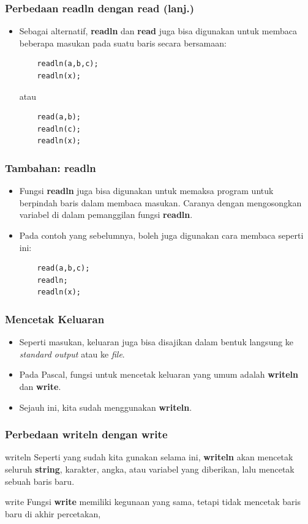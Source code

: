 \documentclass{beamer}
\begin{document}
\begin{frame}[fragile]
\frametitle{Perbedaan readln dengan read (lanj.)}
\begin{itemize}
    \item Sebagai alternatif, \textbf{readln} dan \textbf{read} juga bisa digunakan untuk membaca beberapa masukan pada suatu baris secara bersamaan:
    \begin{lstlisting}
    readln(a,b,c);
    readln(x);
    \end{lstlisting}
    atau
    \begin{lstlisting}
    read(a,b);
    readln(c);
    readln(x);
    \end{lstlisting}
\end{itemize}
\end{frame}

\begin{frame}[fragile]
\frametitle{Tambahan: readln}
\begin{itemize}
    \item Fungsi \textbf{readln} juga bisa digunakan untuk memaksa program untuk berpindah baris dalam membaca masukan. Caranya dengan mengosongkan variabel di dalam pemanggilan fungsi \textbf{readln}.
    \item Pada contoh yang sebelumnya, boleh juga digunakan cara membaca seperti ini:
    \begin{lstlisting}
    read(a,b,c);
    readln;
    readln(x);
    \end{lstlisting}
\end{itemize}
\end{frame}

\begin{frame}
\frametitle{Mencetak Keluaran}
\begin{itemize}
    \item Seperti masukan, keluaran juga bisa disajikan dalam bentuk langsung ke \textit{standard output} atau ke \textit{file}.
    \item Pada Pascal, fungsi untuk mencetak keluaran yang umum adalah \alert{\textbf{writeln}} dan \alert{\textbf{write}}.
    \item Sejauh ini, kita sudah menggunakan \textbf{writeln}.
\end{itemize}
\end{frame}

\begin{frame}[fragile]
\frametitle{Perbedaan writeln dengan write}
\begin{block}{writeln}
    Seperti yang sudah kita gunakan selama ini, \textbf{writeln} akan mencetak seluruh \textbf{string}, karakter, angka, atau variabel yang diberikan, lalu \alert{mencetak} sebuah baris baru.
\end{block}
\begin{block}{write}
    Fungsi \textbf{write} memiliki kegunaan yang sama, tetapi \alert{tidak mencetak} baris baru di akhir percetakan,
\end{block}
\end{frame}
\end{document}
